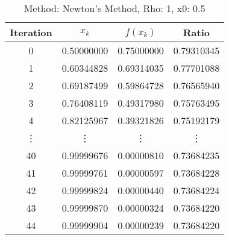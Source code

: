 \begin{table}
\centering
\caption{Method: Newton's Method, Rho: 1, x0: 0.5}
\label{tab:table_Newton's_Method_1_0_5}
\begin{tabular}{c c c c}
\toprule
Iteration &      $x_k$ &   $f(x_k)$ &      Ratio \\
\midrule
        0 & 0.50000000 & 0.75000000 & 0.79310345 \\
        1 & 0.60344828 & 0.69314035 & 0.77701088 \\
        2 & 0.69187499 & 0.59864728 & 0.76565940 \\
        3 & 0.76408119 & 0.49317980 & 0.75763495 \\
        4 & 0.82125967 & 0.39321826 & 0.75192179 \\
   \vdots &     \vdots &     \vdots &     \vdots \\
       40 & 0.99999676 & 0.00000810 & 0.73684235 \\
       41 & 0.99999761 & 0.00000597 & 0.73684228 \\
       42 & 0.99999824 & 0.00000440 & 0.73684224 \\
       43 & 0.99999870 & 0.00000324 & 0.73684220 \\
       44 & 0.99999904 & 0.00000239 & 0.73684220 \\
\bottomrule
\end{tabular}
\end{table}
